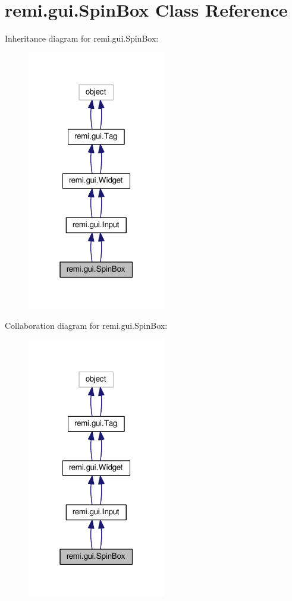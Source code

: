 \hypertarget{classremi_1_1gui_1_1SpinBox}{}\section{remi.\+gui.\+Spin\+Box Class Reference}
\label{classremi_1_1gui_1_1SpinBox}


Inheritance diagram for remi.\+gui.\+Spin\+Box\+:
\nopagebreak
\begin{figure}[H]
\begin{center}
\leavevmode
\includegraphics[width=171pt]{de/d75/classremi_1_1gui_1_1SpinBox__inherit__graph}
\end{center}
\end{figure}


Collaboration diagram for remi.\+gui.\+Spin\+Box\+:
\nopagebreak
\begin{figure}[H]
\begin{center}
\leavevmode
\includegraphics[width=171pt]{d4/d66/classremi_1_1gui_1_1SpinBox__coll__graph}
\end{center}
\end{figure}
